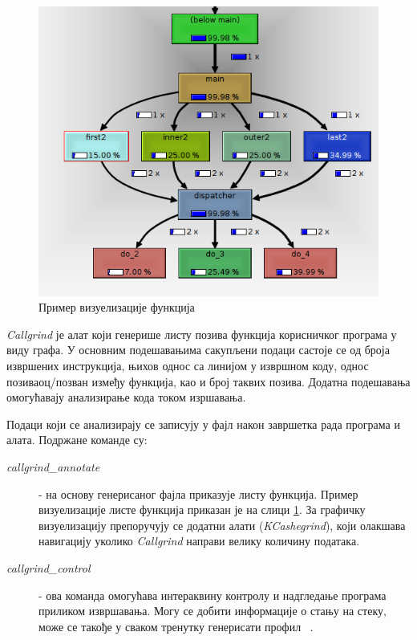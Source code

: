 \documentclass[12pt,oneside]{memoir}
\begin{document}
\begin{figure}[h!]
\begin{center}
\includegraphics[scale=0.75]{slika18.png}
\end{center}
\caption{Пример визуелизације функција}
\label{fig:callgrind}
\end{figure}

\indent \textit{Callgrind} је алат који генерише листу позива функција корисничког програма у виду графа. У основним подешавањима сакупљени подаци састоје се од броја извршених инструкција, њихов однос са линијом у извршном коду, однос позиваоц/позван између функција, као и број таквих позива. Додатна подешавања омогућавају анализирање кода током изршавања. 

\indent Подаци који се анализирају се записују у фајл након завршетка рада програма и алата. Подржане команде су:

\begin{description}
	\item[\textit{callgrind\_annotate}] - на основу генерисаног фајла приказује листу функција. Пример визуелизације листе функција приказан је на слици \ref{fig:callgrind}. За графичку визуелизацију препоручују се додатни алати (\textit{KCashegrind}), који олакшава навигацију уколико \textit{Callgrind} направи велику количину података.
	\item[\textit{callgrind\_control}] - ова команда омогућава интераквину контролу и надгледање програма приликом извршавања. Могу се добити информације о стању на стеку, може се такође у сваком тренутку генерисати профил ~\cite{callgrindRef}. 
\end{description}
\end{document}
